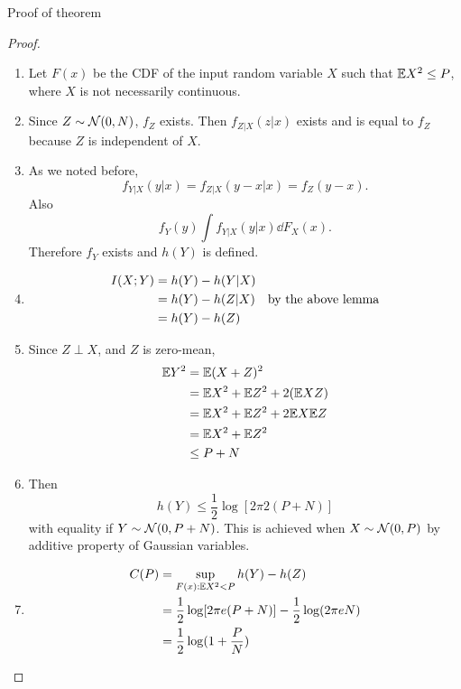 \documentclass[../main.tex]{subfiles}
\begin{document}
\begin{bbox}{Proof of theorem}
    \begin{proof}
        \begin{enumerate}
            \item Let $F(x)$ be the CDF of the input random variable $X$ such that $\mathbb{E} X^2 \leq P$, where $X$ is not necessarily continuous.
            \item Since $Z\sim \mathcal{N}(0,N)$, $f_Z$ exists. Then $f_{Z|X}(z|x)$ exists and is equal to $f_Z$ because $Z$ is independent of $X$.
            \item As we noted before, \[
            f_{Y|X}(y|x)=f_{Z|X}(y-x|x)=f_Z(y-x).
            \] Also \[
            f_Y(y) \int f_{Y|X}(y|x)\dd F_X(x).
            \]
            Therefore $f_Y$ exists and $h(Y)$ is defined.
            \item \begin{align*}
                I(X;Y) &= h(Y)-h(Y|X)\\
                &= h(Y) - h(Z|X)\quad\text{by the above lemma}\\
                &=h(Y)-h(Z)
            \end{align*}
            \item Since $Z\perp X$, and $Z$ is zero-mean,\begin{align*}
                \mathbb{E} Y^2 &= \mathbb{E}(X+Z)^2\\
                &= \mathbb{E} X^2 + \mathbb{E} Z^2 + 2(\mathbb{E} XZ)\\
                &=\mathbb{E} X^2 + \mathbb{E} Z^2 + 2\mathbb{E} X\mathbb{E} Z\\
                &= \mathbb{E} X^2 + \mathbb{E} Z^2\\
                &\leq P + N
            \end{align*}
            \item Then \[
            h(Y)\leq \frac{1}{2}\log[2\pi 2(P+N)]
            \] with equality if $Y\sim \mathcal{N}(0,P+N)$. This is achieved when $X\sim\mathcal{N}(0,P)$ by additive property of Gaussian variables.
            \item \begin{align*}
                C(P) &= \sup_{F(x):\mathbb{E} X^2 <P}h(Y)-h(Z)\\
                &= \frac{1}{2}\log[2\pi e(P+N)]-\frac{1}{2}\log(2\pi e N)\\
                &=\frac{1}{2}\log(1+\frac{P}{N})
            \end{align*}
        \end{enumerate}
    \end{proof}
\end{bbox}
\end{document}
